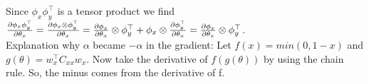 \documentclass[a4paper]{article}
\newcommand{\E}{\mathbb{E}}
\newcommand{\wx}{{w_{x}}}
\newcommand{\wxt}{w_{x}^\top}
\newcommand{\Cxx}{C_{xx}}
\newcommand{\1}{\mathds{1}}
\begin{document}
Since $\phi_x\phi_y^\top$ is a tensor product we find
$
{\partial\phi_x\phi_y^\top\over\partial\theta_x} 
= {\partial\phi_x\otimes\phi_y^\top\over\partial\theta_x}
= {\partial\phi_x\over\partial\theta_x}\otimes\phi_y^\top
+ \phi_x\otimes{\partial\phi_y^\top\over\partial\theta_x}
= {\partial\phi_x\over\partial\theta_x}\otimes\phi_y^\top
$.
\\
Explanation why $\alpha$ became $-\alpha$ in the gradient: Let $f(x) = min(0,1-x)$
and $g(\theta) = \wxt\Cxx\wx$. Now take the derivative of $f(g(\theta))$
by using the chain rule. So, the minus comes from the derivative of f.     
\\
\\
\\
\end{document}
